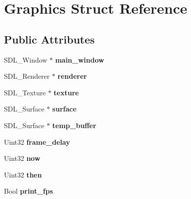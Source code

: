 \hypertarget{struct_graphics}{}\section{Graphics Struct Reference}
\label{struct_graphics}
\subsection*{Public Attributes}
\begin{DoxyCompactItemize}
\item 
\mbox{\label{struct_graphics_a01a208130e8b43f8f3476ca40fdf5dc6}} 
S\+D\+L\+\_\+\+Window $\ast$ {\bfseries main\+\_\+window}
\item 
\mbox{\label{struct_graphics_afee9119ae93eafc5707a9e868b539a2e}} 
S\+D\+L\+\_\+\+Renderer $\ast$ {\bfseries renderer}
\item 
\mbox{\label{struct_graphics_a8d25070ed94d75b031a9faf7078fe7d6}} 
S\+D\+L\+\_\+\+Texture $\ast$ {\bfseries texture}
\item 
\mbox{\label{struct_graphics_a98d0cb7b41ef35c85b2631f962defc6a}} 
S\+D\+L\+\_\+\+Surface $\ast$ {\bfseries surface}
\item 
\mbox{\label{struct_graphics_a4ef81d168643e37c164edbb3a56b6c53}} 
S\+D\+L\+\_\+\+Surface $\ast$ {\bfseries temp\+\_\+buffer}
\item 
\mbox{\label{struct_graphics_aa4d33da8deb82b40a00fd3d6e724c7c2}} 
Uint32 {\bfseries frame\+\_\+delay}
\item 
\mbox{\label{struct_graphics_a3b20102adad401229958584e1a834c96}} 
Uint32 {\bfseries now}
\item 
\mbox{\label{struct_graphics_abd80a0c015a63df13f8b8046fc321e50}} 
Uint32 {\bfseries then}
\item 
\mbox{\label{struct_graphics_a23d65c6fa6e5bb1ccbacfb6382db8d19}} 
Bool {\bfseries print\+\_\+fps}
\item 
\mbox{\label{struct_graphics_a3dc577911c14fee1d3a6c96881bcda4d}} 

\end{DoxyCompactItemize}
